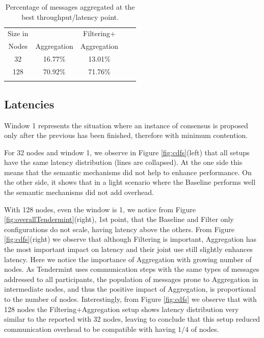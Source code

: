 \begin{table}[h!]
\centering
	\begin{tabular}{c c c c c }
	\hline
     Size in     &       &  Filtering+  \\ 
	 Nodes & Aggregation    & Aggregation  \\  \hline
	32  		&	16.77\%	&  13.01\% \\
	128  		&	70.92\%	&  71.76\%  \\ \hline \\
	\end{tabular}
	\caption{Percentage of messages aggregated  at the best throughput/latency point.}
\end{table}


\subsection{Latencies}
\label{sec:latency-cdfs}

Window 1 represents the situation where an instance of consensus is proposed only after the previous has been finished, therefore with minimum contention.

For 32 nodes and window 1, we observe in Figure \ref{fig:cdfs}(left) that all setups have the same latency distribution (lines are collapsed).  At the one side this means that the semantic mechanisms did not help to enhance performance.  On the other side, it shows that in a light scenario where the Baseline performs well the semantic mechanisms did not add overhead. 

With 128 nodes, even the window is 1, we notice 
from Figure \ref{fig:overallTendermint}(right), 1st point,
that the Baseline and Filter only configurations do not scale, having latency above the others.  From Figure \ref{fig:cdfs}(right) we observe that
although Filtering is important, Aggregation has the most important impact on latency and their joint use still slightly enhances latency.    Here we notice the importance of Aggregation with growing number of nodes.  As Tendermint uses communication steps with the same types of messages addressed to all participants, the population of messages prone to Aggregation in intermediate nodes, and thus the positive impact of Aggregation, is proportional to the number of nodes.    
%
Interestingly, from Figure \ref{fig:cdfs} we observe that with 128 nodes the Filtering+Aggregation setup shows latency distribution very similar to the reported with 32 nodes, leaving to conclude that this setup reduced communication overhead to be compatible with having $1/4$ of nodes.    


